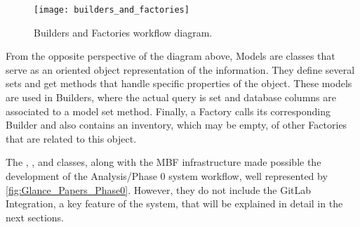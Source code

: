 \begin{figure}[htb]
    \centering
    \texttt{[image: builders\_and\_factories]}
    \caption{Builders and Factories workflow diagram.}%
    \label{fig:builders_and_factories}
\end{figure}

From the opposite perspective of the diagram above, Models are classes that serve as an oriented object representation of the information. They define several sets and get methods that handle specific properties of the object. These models are used in Builders, where the actual query is set and database columns are associated to a model set method. Finally, a Factory calls its corresponding Builder and also contains an inventory, which may be empty, of other Factories that are related to this object.

The , ,  and  classes, along with the MBF infrastructure made possible the development of the Analysis/Phase 0 system workflow, well represented by \cref{fig:Glance_Papers_Phase0}.
However, they do not include the GitLab Integration, a key feature of the system, that will be explained in detail in the next sections.


